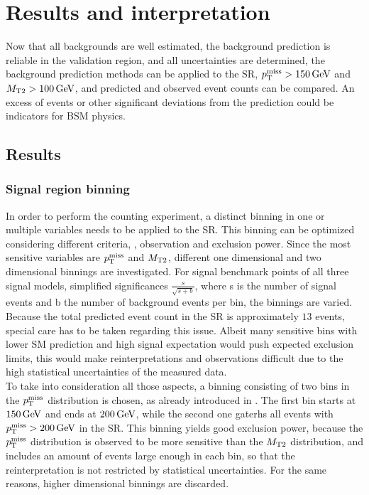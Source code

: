 \chapter{Results and interpretation}\label{chap:results}
\minitoc
Now that all backgrounds are well estimated, the background prediction is reliable in the validation region, and all uncertainties are determined, the background prediction methods can be applied to the SR, $p_{\mathrm{T}}^\text{miss}>150\,\text{Ge\hspace{-.08em}V}$ and $M_{\mathrm{T2}}>100\,\text{Ge\hspace{-.08em}V}$, and predicted and observed event counts can be compared. An excess of events or other significant deviations from the prediction could be indicators for BSM physics.
\section{Results}\label{sec:results}
\subsection*{Signal region binning}
In order to perform the counting experiment, a distinct binning in one or multiple variables needs to be applied to the SR. This binning can be optimized considering different criteria, \eg, observation and exclusion power. Since the most sensitive variables are $p_{\mathrm{T}}^\text{miss}$ and $M_{\mathrm{T2}}$, different one dimensional and two dimensional binnings are investigated. For signal benchmark points of all three signal models, simplified significances $\frac{s}{\sqrt{s+b}}$, where s is the number of signal events and b the number of background events per bin, the binnings are varied. Because the total predicted event count in the SR is approximately $13$ events, special care has to be taken regarding this issue. Albeit many sensitive bins with lower SM prediction and high signal expectation would push expected exclusion limits, this would make reinterpretations and observations difficult due to the high statistical uncertainties of the measured data.\\
To take into consideration all those aspects, a binning consisting of two bins in the $p_{\mathrm{T}}^\text{miss}$ distribution is chosen, as already introduced in . The first bin starts at $150\,\text{Ge\hspace{-.08em}V}$ and ends at $200\,\text{Ge\hspace{-.08em}V}$, while the second one gaterhs all events with $p_{\mathrm{T}}^\text{miss}>200\,\text{Ge\hspace{-.08em}V}$ in the SR. This binning yields good exclusion power, because the $p_{\mathrm{T}}^\text{miss}$ distribution is observed to be more sensitive than the $M_{\mathrm{T2}}$ distribution, and includes an amount of events large enough in each bin, so that the reinterpretation is not restricted by statistical uncertainties. For the same reasons, higher dimensional binnings are discarded.
